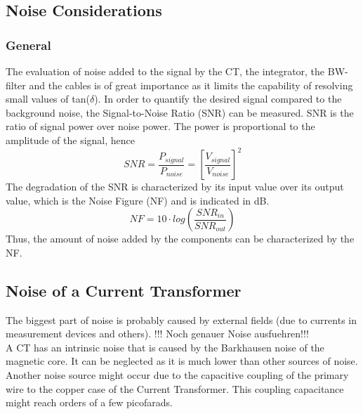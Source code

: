 \subsection{Noise Considerations}
\subsubsection{General}
The evaluation of noise added to the signal by the CT, the integrator, the BW-filter and the cables is of great importance as it limits the capability of resolving small values of tan($\delta$).
In order to quantify the desired signal compared to the background noise, the Signal-to-Noise Ratio (SNR) can be measured. SNR is  the ratio of signal power over noise power. The power is proportional to the amplitude of the signal, hence
\begin{equation}
	SNR=\frac{P_{signal}}{P_{noise}} = \left[\frac{V_{signal}}{V_{noise}}\right]^2
\end{equation}
The degradation of the SNR is characterized by its input value over its output value, which is the Noise Figure (NF) and is indicated in dB.
\begin{equation}
	NF = 10\cdot log\left(\frac{SNR_{in}}{SNR_{out}}\right)
\end{equation}
Thus, the amount of noise added by the components can be characterized by the NF. 
\subsection{Noise of a Current Transformer}
The biggest part of noise is probably caused by external fields (due to currents in measurement devices and others). 
!!! Noch genauer Noise ausfuehren!!!\\
A CT has an intrinsic noise that is caused by the Barkhausen noise of the magnetic core. It can be neglected as it is much lower than other sources of noise. %
Another noise source might occur due to the capacitive coupling of the primary wire to the copper case of the Current Transformer. This coupling capacitance might reach orders of a few picofarads. %



